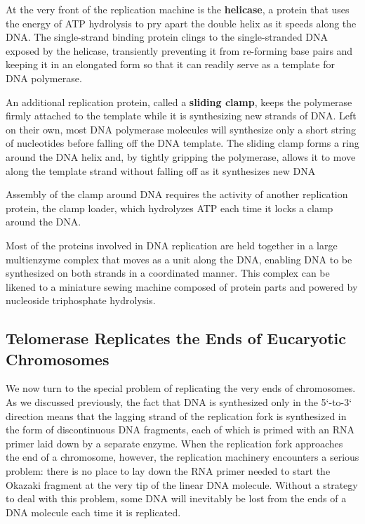 At the very front of the replication
machine is the \textbf{helicase}, a protein that uses the energy of ATP hydrolysis
to pry apart the double helix as it speeds along the DNA.
The single-strand binding protein clings to the single-stranded
DNA exposed by the helicase, transiently preventing it from re-forming
base pairs and keeping it in an elongated form so that it can readily serve
as a template for DNA polymerase.

An additional replication protein, called a \textbf{sliding clamp}, keeps the
polymerase firmly attached to the template while it is synthesizing new
strands of DNA. Left on their own, most DNA polymerase molecules will
synthesize only a short string of nucleotides before falling off the DNA
template. The sliding clamp forms a ring around the DNA helix and, by
tightly gripping the polymerase, allows it to move along the template
strand without falling off as it synthesizes new DNA

Assembly of the clamp around DNA requires the activity of another
replication protein, the clamp loader, which hydrolyzes
ATP each time it locks a clamp around the DNA.

Most of the proteins involved in DNA replication are held together in a
large multienzyme complex that moves as a unit along the DNA, enabling
DNA to be synthesized on both strands in a coordinated manner.
This complex can be likened to a miniature sewing machine composed of
protein parts and powered by nucleoside triphosphate hydrolysis.

\subsection{Telomerase Replicates the Ends of Eucaryotic Chromosomes}

We now turn to the special problem of replicating the very ends of chromosomes. As we discussed previously,
the fact that DNA is synthesized only in the 5`-to-3` direction means that
the lagging strand of the replication fork is synthesized in the form of discontinuous
DNA fragments, each of which is primed with an RNA primer laid down by a separate enzyme.
When the replication fork approaches the end of a chromosome, however, the replication
machinery encounters a serious problem: there is no place to lay down
the RNA primer needed to start the Okazaki fragment at the very tip of
the linear DNA molecule. Without a strategy to deal with this problem,
some DNA will inevitably be lost from the ends of a DNA molecule each
time it is replicated.

